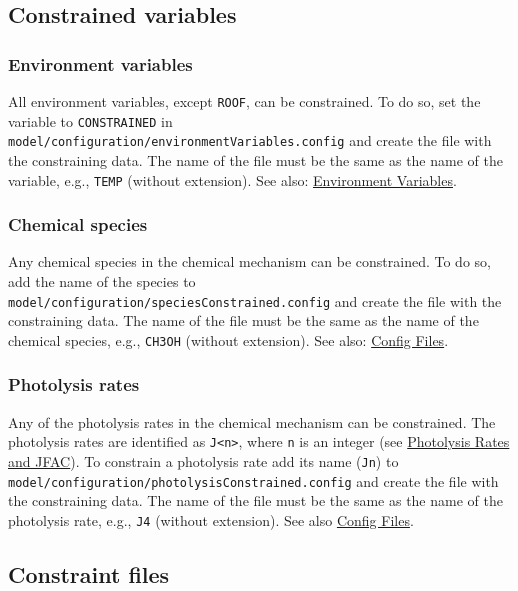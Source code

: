 \subsection{Constrained variables} \label{subsec:constrained-variables}

\subsubsection{Environment variables}

All environment variables, except \texttt{ROOF}, can be
constrained. To do so, set the variable to \texttt{CONSTRAINED} in
\texttt{model/configuration/environmentVariables.config} and create
the file with the constraining data. The name of the file must be the
same as the name of the variable, e.g., \texttt{TEMP} (without
extension). See also: \hyperref[sec:environment-variables]{Environment Variables}.

\subsubsection{Chemical species}

Any chemical species in the chemical mechanism can be constrained. To
do so, add the name of the species to
\texttt{model/configuration/speciesConstrained.config} and create the
file with the constraining data. The name of the file must be the same
as the name of the chemical species, e.g., \texttt{CH3OH} (without
extension). See also: \hyperref[sec:config-files]{Config Files}.

\subsubsection{Photolysis rates}

Any of the photolysis rates in the chemical mechanism can be
constrained. The photolysis rates are identified as \verb|J<n>|, where
\texttt{n} is an integer (see
\hyperref[sec:photolysis-rates]{Photolysis Rates and JFAC}). To
constrain a photolysis rate add its name (\texttt{Jn}) to\\
\texttt{model/configuration/photolysisConstrained.config} and create
the file with the constraining data. The name of the file must be the
same as the name of the photolysis rate, e.g., \texttt{J4} (without
extension). See also \hyperref[sec:config-files]{Config Files}.

\subsection{Constraint files} \label{subsec:constraint-files}

